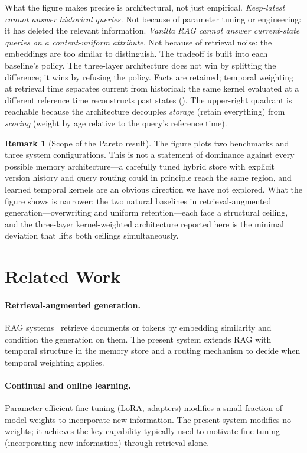 \documentclass[11pt]{article}
\theoremstyle{plain}
\theoremstyle{definition}
\newtheorem{remark}[theorem]{Remark}
\begin{document}
What the figure makes precise is architectural,
not just empirical.  \emph{Keep-latest cannot
answer historical queries.}  Not because of
parameter tuning or engineering: it has deleted the
relevant information.  \emph{Vanilla RAG cannot
answer current-state queries on a content-uniform
attribute.}  Not because of retrieval noise: the
embeddings are too similar to distinguish.  The
tradeoff is built into each baseline's policy.  The
three-layer architecture does not win by splitting
the difference; it wins by refusing the policy.
Facts are retained; temporal weighting at retrieval
time separates current from historical; the same
kernel evaluated at a different reference time
reconstructs past states
().  The upper-right quadrant
is reachable because the architecture decouples
\emph{storage} (retain everything) from
\emph{scoring} (weight by age relative to the
query's reference time).

\begin{remark}[Scope of the Pareto result]
The figure plots two benchmarks and three system
configurations.  This is not a statement of
dominance against every possible memory
architecture---a carefully tuned hybrid store with
explicit version history and query routing could in
principle reach the same region, and learned
temporal kernels are an obvious direction we have
not explored.  What the figure shows is narrower:
the two natural baselines in
retrieval-augmented generation---overwriting and
uniform retention---each face a structural
ceiling, and the three-layer kernel-weighted
architecture reported here is the minimal
deviation that lifts both ceilings simultaneously.
\end{remark}


\section{Related Work}\label{sec:related}

\paragraph{Retrieval-augmented generation.}  RAG
systems~\cite{borgeaud2021retro,wu2022memorizing}
retrieve documents or tokens by embedding similarity
and condition the generation on them.  The present
system extends RAG with temporal structure in the
memory store and a routing mechanism to decide when
temporal weighting applies.

\paragraph{Continual and online learning.}
Parameter-efficient fine-tuning (LoRA, adapters)
modifies a small fraction of model weights to
incorporate new information.  The present system
modifies no weights; it achieves the key capability
typically used to motivate fine-tuning (incorporating
new information) through retrieval alone.
\end{document}

